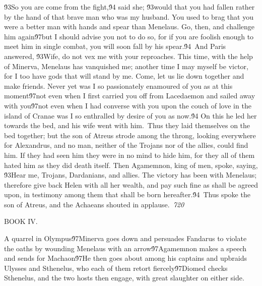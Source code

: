 {\'93So you are come from the fight,\'94 said she; \'93would that you had fallen rather by the hand of that brave man who was my husband. You used to brag that you were a better man with hands and spear than Menelaus. Go, then, and challenge him again\'97but I should advise you not to do so, for if you are foolish enough to meet him in single combat, you will soon fall by his spear.\'94\
And Paris answered, \'93Wife, do not vex me with your reproaches. This time, with the help of Minerva, Menelaus has vanquished me; another time I may myself be victor, for I too have gods that will stand by me. Come, let us lie down together and make friends. Never yet was I so passionately enamoured of you as at this moment\'97not even when I first carried you off from Lacedaemon and sailed away with you\'97not even when I had converse with you upon the couch of love in the island of Cranae was I so enthralled by desire of you as now.\'94 On this he led her towards the bed, and his wife went with him.\
Thus they laid themselves on the bed together; but the son of Atreus strode among the throng, looking everywhere for Alexandrus, and no man, neither of the Trojans nor of the allies, could find him. If they had seen him they were in no mind to hide him, for they all of them hated him as they did death itself. Then Agamemnon, king of men, spoke, saying, \'93Hear me, Trojans, Dardanians, and allies. The victory has been with Menelaus; therefore give back Helen with all her wealth, and pay such fine as shall be agreed upon, in testimony among them that shall be born hereafter.\'94\
Thus spoke the son of Atreus, and the Achaeans shouted in applause.\
\pard{}\sl720\qc{}

\fs48  BOOK IV.\
\pard{}\li1710\ri1710\sa64\qj\partightenfactor0

\fs25\fsmilli12800 \cf2 A quarrel in Olympus\'97Minerva goes down and persuades Fandarus to violate the oaths by wounding Menelaus with an arrow\'97Agamemnon makes a speech and sends for Machaon\'97He then goes about among his captains and upbraids Ulysses and Sthenelus, who each of them retort fiercely\'97Diomed checks Sthenelus, and the two hosts then engage, with great slaughter on either side.\
\pard\pardeftab720\qj{}

}
